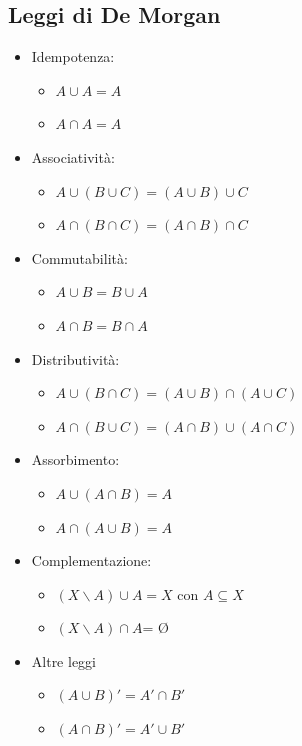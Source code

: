 \documentclass[italian]{article}
\begin{document}
\subsection{Leggi di De Morgan}
\begin{itemize}
	\item Idempotenza:
	
	\begin{itemize}
		\item $A\cup A=A$
		\item $A\cap A=A$
	\end{itemize}
	\item Associatività:
	
	\begin{itemize}
		\item $A\cup(B\cup C)=(A\cup B)\cup C$
		\item $A\cap(B\cap C)=(A\cap B)\cap C$
	\end{itemize}
	\item Commutabilità:
	
	\begin{itemize}
		\item $A\cup B=B\cup A$
		\item $A\cap B=B\cap A$
	\end{itemize}
	\item Distributività:
	
	\begin{itemize}
		\item $A\cup(B\cap C)=(A\cup B)\cap(A\cup C)$
		\item $A\cap(B\cup C)=(A\cap B)\cup(A\cap C)$
	\end{itemize}
	\item Assorbimento:
	
	\begin{itemize}
		\item $A\cup(A\cap B)=A$
		\item $A\cap(A\cup B)=A$
	\end{itemize}
	\item Complementazione:
	
	\begin{itemize}
		\item $(X\backslash A)\cup A=X$ con $A\subseteq X$
		\item $(X\backslash A)\cap A$= $\textrm{Ø}$
	\end{itemize}
\end{itemize}
\begin{itemize}
	\item Altre leggi
	\begin{itemize}
			\item $(A\cup B)'=A'\cap B'$
			\item $(A\cap B)'=A'\cup B'$
	\end{itemize}
\end{itemize}
\end{document}
